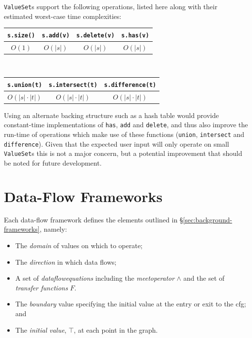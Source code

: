 \documentclass[bsc,twoside,singlespacing,parskip,logo,notimes,normalheadings]{infthesis}
\begin{document}
    {\tt ValueSet}s support the following operations, listed here
    along with their estimated worst-case time complexities:

    \begin{table}[!ht]
      \centering
      \def\arraystretch{1.2}
      \begin{tabularx}{0.8\textwidth}{|C|C|C|C|}
        \hline
            {\tt s.size()} & {\tt s.add(v)} & {\tt s.delete(v)} & {\tt s.has(v)} \\ \hline
            $O(1)$         & $O(|s|)$       & $O(|s|)$          & $O(|s|)$       \\ \hline
      \end{tabularx}
      \\[2mm]
      \begin{tabularx}{0.8\textwidth}{|C|C|C|}
        \hline
            {\tt s.union(t)}   & {\tt s.intersect(t)} & {\tt s.difference(t)} \\ \hline
            $O(|s| \cdot |t|)$ & $O(|s| \cdot |t|)$   & $O(|s| \cdot |t|)$    \\ \hline
      \end{tabularx}
    \end{table}

    Using an alternate backing structure such as a hash table would
    provide constant-time implementations of {\tt has}, {\tt add} and
    {\tt delete}, and thus also improve the run-time of operations
    which make use of these functions ({\tt union}, {\tt intersect}
    and {\tt difference}). Given that the expected user input will
    only operate on small {\tt ValueSet}s this is not a major concern,
    but a potential improvement that should be noted for future
    development.
    
    \section{Data-Flow Frameworks}
    
    Each data-flow framework defines the elements outlined in
    \S\ref{sec:background-frameworks}, namely:

    \begin{itemize}
    \item The {\em \gls{domain}} of values on which to operate;
    \item The {\em \gls{direction}} in which data flows;
    \item A set of {\em \gls{dataflowequations}} including the {\em
        \gls{meetoperator}} $\land$ and the set of {\em
        \gls{transfer} functions} $F$.
    \item The {\em \gls{boundary}} value specifying the initial value
      at the entry or exit to the \gls{cfg}; and
    \item The {\em initial value}, $\top$, at each point in the graph.
    \end{itemize}
\end{document}
